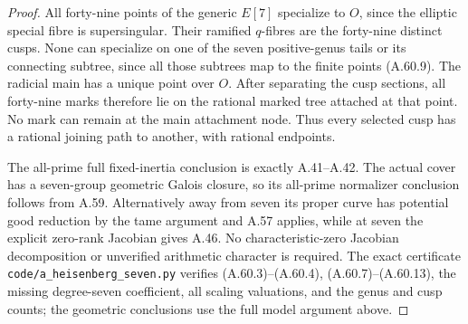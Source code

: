 \begin{proof}
All forty-nine points of the generic \(E[7]\)
specialize to \(O\), since the elliptic special
fibre is supersingular. Their ramified \(q\)-fibres
are the forty-nine distinct cusps. None can
specialize on one of the seven positive-genus
tails or its connecting subtree, since all
those subtrees map to the finite points (A.60.9).
The radicial main has a unique point over \(O\).
After separating the cusp sections, all forty-nine
marks therefore lie on the rational marked tree
attached at that point. No mark can remain at
the main attachment node. Thus every selected
cusp has a rational joining path to another,
with rational endpoints.

The all-prime full fixed-inertia conclusion is
exactly A.41--A.42. The actual cover has a
seven-group geometric Galois closure, so its
all-prime normalizer conclusion follows from
A.59. Alternatively away from seven its proper
curve has potential good reduction by the tame
argument and A.57 applies, while at seven the
explicit zero-rank Jacobian gives A.46. No
characteristic-zero Jacobian decomposition or
unverified arithmetic character is required. The exact
certificate \texttt{code/a\_heisenberg\_seven.py} verifies
(A.60.3)--(A.60.4), (A.60.7)--(A.60.13),
the missing degree-seven coefficient, all scaling valuations,
and the genus and cusp counts; the geometric conclusions
use the full model argument above.
\end{proof}
